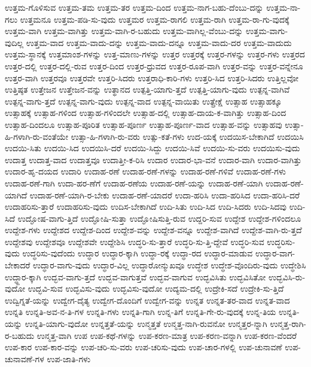 {ಉತ್ತಮ-ಗೊಳಿಸುವ
ಉತ್ತಮ-ತಮ
ಉತ್ತಮ-ತರ
ಉತ್ತಮ-ದಿಂದ
ಉತ್ತಮ-ನಾಗ-ಬಹು-ದೆಂಬು-ದನ್ನು
ಉತ್ತಮ-ನಾ-ಗಲು
ಉತ್ತಮನೂ
ಉತ್ತಮ-ಪಡಿ-ಸು-ವುದು
ಉತ್ತಮರ
ಉತ್ತಮ-ರಾಗಲಿ
ಉತ್ತಮ-ರಾಗಿ
ಉತ್ತಮ-ರಾ-ಗು-ವುದಕ್ಕೆ
ಉತ್ತಮ-ವಾಗಿ
ಉತ್ತಮ-ವಾಗಿತ್ತು
ಉತ್ತಮ-ವಾಗಿ-ರ-ಬಹುದು
ಉತ್ತಮ-ವಾಗಿಲ್ಲ-ವೆಂಬು-ದನ್ನು
ಉತ್ತಮ-ವಾಗು-ವುದಿಲ್ಲ
ಉತ್ತಮ-ವಾದ
ಉತ್ತಮ-ವಾದು-ದನ್ನು
ಉತ್ತಮ-ವಾದು-ದನ್ನೂ
ಉತ್ತಮ-ವಾದು-ದರ
ಉತ್ತಮ-ವಾದುದು
ಉತ್ತಮ-ಸ್ಥಾನಕ್ಕೆ
ಉತ್ತಮಾಂಶ-ಗಳನ್ನು
ಉತ್ತ-ಮಾಣು-ಗಳನ್ನು
ಉತ್ತರ
ಉತ್ತರಕ್ಕೆ
ಉತ್ತರ-ಗಳನ್ನು
ಉತ್ತರ-ಗಳು
ಉತ್ತರದ
ಉತ್ತರ-ದಲ್ಲಿ
ಉತ್ತರ-ದಲ್ಲಿ-ರುವ
ಉತ್ತರ-ದಿಂದ
ಉತ್ತರ-ಧ್ರುವದ
ಉತ್ತರ-ರೂಪ-ವಾಗಿ
ಉತ್ತರ-ವನ್ನು
ಉತ್ತರ-ವನ್ನೇನೂ
ಉತ್ತರ-ವಾಗಿ
ಉತ್ತರವೂ
ಉತ್ತರವೇ
ಉತ್ತರಿ-ಸಿದರು
ಉತ್ತರಾಧಿ-ಕಾರಿ-ಗಳು
ಉತ್ತರಿ-ಸಿದ
ಉತ್ತರಿ-ಸಿದರು
ಉತ್ತಿಲ್ಲವೋ
ಉತ್ತಿಷ್ಠತ
ಉತ್ತೇಜನ
ಉತ್ತೇಜನ-ವನ್ನು
ಉತ್ಥಾನದ
ಉತ್ಪತ್ತಿ-ಯಾಗು-ತ್ತದೆ
ಉತ್ಪತ್ತಿ-ಯಾಗು-ವುದು
ಉತ್ಪನ್ನ-ವಾಗಿವೆ
ಉತ್ಪನ್ನ-ವಾಗು-ತ್ತದೆ
ಉತ್ಪನ್ನ-ವಾಗು-ವುದು
ಉತ್ಪನ್ನ-ವಾದ
ಉತ್ಪನ್ನ-ವಾಯಿತು
ಉತ್ಪ್ರೇಕ್ಷೆ
ಉತ್ಸಾಹ
ಉತ್ಸಾಹಕ್ಕೂ
ಉತ್ಸಾಹಕ್ಕೆ
ಉತ್ಸಾಹ-ಗಳಿಂದ
ಉತ್ಸಾಹ-ಗಳಿಂದಲೇ
ಉತ್ಸಾಹ-ದಲ್ಲಿ
ಉತ್ಸಾಹ-ದಾಯ-ಕ-ವಾಗಿತ್ತು
ಉತ್ಸಾಹ-ದಿಂದ
ಉತ್ಸಾಹ-ದಿಂದಲೂ
ಉತ್ಸಾಹ-ಪೂರಿತ
ಉತ್ಸಾಹ-ಪೂರ್ಣ
ಉತ್ಸಾಹ-ಪೂರ್ಣ-ವಾದ
ಉತ್ಸಾಹ-ವನ್ನು
ಉತ್ಸಾಹವು
ಉತ್ಸಾ-ಹಿ-ಗಳಾಗಿ-ರು-ವಂತೆಯೇ
ಉತ್ಸಾ-ಹಿ-ಗಳಾಗಿ-ರು-ವರು
ಉತ್ಸು-ಕತೆ-ಗಳು
ಉದ-ಯಕ್ಕೆ
ಉದಯಿಸ-ಬೇಕಾಗಿದೆ
ಉದಯಿಸಿ
ಉದಯಿ-ಸಿತು
ಉದಯಿ-ಸಿದ
ಉದಯಿಸಿ-ದರೆ
ಉದಯಿ-ಸಿದ್ದು
ಉದಯಿ-ಸಿವೆ
ಉದಯಿ-ಸು-ವರು
ಉದಯಿಸು-ವುದು
ಉದಾತ್ತ
ಉದಾತ್ತ-ವಾದ
ಉದಾತ್ತವೂ
ಉದಾತ್ತೀ-ಕ-ರಿಸಿ
ಉದಾರ
ಉದಾರ-ಭಾ-ವನೆ
ಉದಾರ-ವಾಗಿ
ಉದಾರ-ವಾಗಿತ್ತು
ಉದಾರ-ಹೃ-ದಯದ
ಉದಾರಿ
ಉದಾಹ-ರಣೆ
ಉದಾಹ-ರಣೆ-ಗಳನ್ನು
ಉದಾಹ-ರಣೆ-ಗಳಿವೆ
ಉದಾಹ-ರಣೆ-ಗಳು
ಉದಾಹ-ರಣೆ-ಗಾಗಿ
ಉದಾ-ಹರ-ಣೆಗೆ
ಉದಾಹ-ರಣೆಯ
ಉದಾಹ-ರಣೆ-ಯನ್ನು
ಉದಾಹ-ರಣೆ-ಯಾಗಿ
ಉದಾಹ-ರಣೆ-ಯಾಗಿದೆ
ಉದಾಹ-ರಣೆ-ಯಾಗಿ-ರ-ಬೇಕು
ಉದಾಹ-ರಣೆ-ಯಾದರೆ
ಉದಾ-ಹರಿಸಿ
ಉದಾ-ಹರಿಸಿದ
ಉದಾ-ಹರಿಸಿ-ದರೆ
ಉದಾಹರಿಸು-ತ್ತಾರೆ
ಉದಾಹರಿಸು-ವುದು
ಉದಿಸ-ಬೇಕಾಗಿದೆ
ಉದಿ-ಸಿತು
ಉದಿ-ಸಿದ
ಉದಿ-ಸಿದರು
ಉದಿ-ಸಿದವು
ಉದಿ-ಸಿದೆ
ಉದ್ಘೋಷ-ವಾಗು-ತ್ತಿದೆ
ಉದ್ಘೋಷಿ-ಸುತ್ತಾ
ಉದ್ಘೋಷಿಸುತ್ತಿ-ರುವ
ಉದ್ದರಿ-ಸುವ
ಉದ್ದೇಶ
ಉದ್ದೇಶ-ಗಳಿಂದಲೂ
ಉದ್ದೇಶ-ಗಳು
ಉದ್ದೇಶದ
ಉದ್ದೇಶ-ದಿಂದ
ಉದ್ದೇಶ-ವನ್ನು
ಉದ್ದೇಶ-ವನ್ನೂ
ಉದ್ದೇಶ-ವಾಗಿದೆ
ಉದ್ದೇಶ-ವಾಗಿ-ರು-ತ್ತದೆ
ಉದ್ದೇಶವು
ಉದ್ದೇಶವೂ
ಉದ್ದೇಶವೇ
ಉದ್ದೇಶಿಸಿ
ಉದ್ಧರಿ-ಸು-ತ್ತಾರೆ
ಉದ್ಧರಿ-ಸು-ತ್ತಿ-ದ್ದೇವೆ
ಉದ್ಧರಿ-ಸುವ
ಉದ್ಧರಿಸು-ವುದು
ಉದ್ಧರಿಸು-ವುದೆಂದು
ಉದ್ಧಾರ
ಉದ್ಧಾರ-ಕ್ಕಾಗಿ
ಉದ್ಧಾ-ರಕ್ಕೆ
ಉದ್ಧಾ-ರದ
ಉದ್ಧಾರ-ಮಾಡುವ
ಉದ್ಧಾರ-ವಾಗ-ಬೇಕಾದರೆ
ಉದ್ಧಾರ-ವಾಗು-ವುದು
ಉದ್ಧಾರ-ವಿಲ್ಲ
ಉದ್ಧಾರೋನ್ಮುಖವೂ
ಉದ್ಧೇಶ
ಉದ್ಧೇಶ-ವೊಂದಿರು-ವುದು
ಉದ್ಧೇಶಿಸಿ
ಉದ್ಧ್ದಾರ-ಕ್ಕಾಗಿ
ಉದ್ಭವ-ವಾಗು-ತ್ತದೆ
ಉದ್ಭವ-ವಾಗುತ್ತವೆ
ಉದ್ಭವ-ವಾಗುವ
ಉದ್ಭವಿಸಿತು
ಉದ್ಭವಿಸಿತೋ
ಉದ್ಭವಿಸಿ-ರು-ವುದೋ
ಉದ್ಭವಿ-ಸುವ
ಉದ್ಭವಿಸು-ವುದು
ಉದ್ಭವಿಸು-ವುದೋ
ಉದ್ಯಮ-ದಲ್ಲಿ
ಉದ್ರೇಕಿ-ಸದೆ
ಉದ್ರೇಕಿ-ಸು-ತ್ತಿದೆ
ಉದ್ವಿಗ್ನತೆ-ಯನ್ನು
ಉದ್ವೇಗ-ದೈತ್ಯ
ಉದ್ವೇಗ-ದೊಂದಿಗೆ
ಉದ್ವೇಗ-ವನ್ನು
ಉನ್ನತ
ಉನ್ನತ-ತರ-ವಾದ
ಉನ್ನತ-ವಾದ
ಉನ್ನತಿ
ಉನ್ನತಿ-ಅವ-ನ-ತಿ-ಗಳ
ಉನ್ನತಿ-ಗಳು
ಉನ್ನತಿ-ಗಾಗಿ
ಉನ್ನ-ತಿಗೆ
ಉನ್ನತಿ-ಗೇ-ರು-ವುದಕ್ಕೆ
ಉನ್ನ-ತಿಯ
ಉನ್ನತಿ-ಯನ್ನು
ಉನ್ನತಿ-ಯಾಗು-ವುದೋ
ಉನ್ನತ್ತತೆ-ಯನ್ನು
ಉನ್ಮತ್ತತೆ
ಉನ್ಮತ್ತ-ನಾಗಿ-ರುವನೋ
ಉನ್ಮತ್ತರ-ನ್ನಾಗಿ
ಉನ್ಮತ್ತ-ರಾಗಿ-ರ-ಬಹುದು
ಉನ್ಮತ್ತ-ವಾಗಿ
ಉಪ
ಉಪ-ಕಥೆ-ಗಳನ್ನು
ಉಪ-ಕರಣ-ಮಾತ್ರ
ಉಪ-ಕರಣ-ವನ್ನಾಗಿ
ಉಪ-ಕರಣ-ವೆಂದರೆ
ಉಪ-ಕಾರ
ಉಪ-ಕಾರ-ವನ್ನು
ಉಪ-ಚರಿ-ಸು-ವರು
ಉಪ-ಚರಿಸು-ವುದು
ಉಪ-ಚಾರ-ಗಳಲ್ಲಿ
ಉಪ-ಚುನಾವಣೆ
ಉಪ-ಚುನಾವಣೆ-ಗಳ
ಉಪ-ಜಾತಿ-ಗಳು
}

